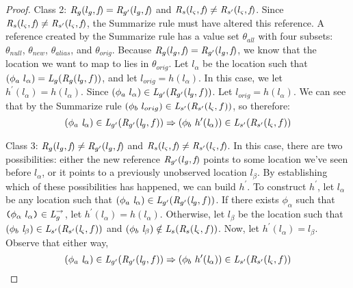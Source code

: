 \begin{proof}
Class 2: $\emph{R}_{g} ( l_{g},  \emph{f}) = \emph{R}_{g^\prime} ( l_{g},  \emph{f})$ and $\emph{R}_{s} ( l_{\varsigma},  \emph{f}) \neq \emph{R}_{s^\prime} ( l_{\varsigma},  \emph{f})$. Since $\emph{R}_{s} ( l_{\varsigma},  \emph{f}) \neq \emph{R}_{s^\prime} ( l_{\varsigma},  \emph{f})$, the Summarize rule must have altered this reference. A reference created by the Summarize rule has a value set $\theta_{all}$ with four subsets: $\theta_{null}$, $\theta_{new}$, $\theta_{alias}$, and $\theta_{orig}$. Because $\emph{R}_{g} ( l_{g},  \emph{f}) = \emph{R}_{g^\prime} ( l_{g},  \emph{f})$, we know that the location we want to map to lies in $\theta_{orig}$. Let $l_\alpha$ be the location such that ${(\phi_a\ l_\alpha)} = \cfgnt{L}_{\gse}(\cfgnt{R}_{\gse} (\cfgnt{l}_\gse,f )) $, and let $l_{orig} = h(l_\alpha)$. In this case, we let $h^\prime(l_\alpha) = h(l_\alpha)$. Since $(\phi_a\ l_\alpha) \in \emph{L}_{g^\prime}(\emph{R}_{g^\prime} (\emph{l}_{g},f ))$. Let $l_{orig} = h(l_\alpha)$. We can see that by the Summarize rule $ (\phi_b\ l_{orig})\in \emph{L}_{s^\prime}(\emph{R}_{s^\prime} (\emph{l}_{\varsigma},f ))$, so therefore:
$$(\phi_a\ \cfgnt{l}_\alpha) \in \cfgnt{L}_{\gse^\prime}(\cfgnt{R}_{\gse^\prime} (\cfgnt{l}_\gse,f )) \Rightarrow (\phi_b\ h^\prime (\cfgnt{l}_\alpha))\in \cfgnt{L}_{s^\prime}(\cfgnt{R}_{s^\prime} (\cfgnt{l}_\sym,f ))$$

Class 3: $\emph{R}_{g} ( l_{g},  \emph{f}) \neq \emph{R}_{g^\prime} ( l_{g},  \emph{f})$ and $\emph{R}_{s} ( l_{\varsigma},  \emph{f}) \neq \emph{R}_{s^\prime} ( l_{\varsigma},  \emph{f})$. In this case, there are two possibilities: either the new reference $\emph{R}_{g^\prime} ( l_{g},  \emph{f})$ points to some location we've seen before $l_\alpha$, or it points to a previously unobserved location $l_\beta$. By establishing which of these possibilities has happened, we can build $h^\prime$. To construct $h^\prime$, let $l_\alpha$ be any location such that $(\phi_a\ \cfgnt{l}_\alpha) \in \cfgnt{L}_{\gse^\prime}(\cfgnt{R}_{\gse^\prime} (\cfgnt{l}_\gse,f )) $. If there exists $\phi_\alpha$ such that $\texttt{(} \phi_\alpha\ l_\alpha \texttt{)} \in \emph{L}_{g}^\rightarrow $, let $h^\prime(l_\alpha) = h(l_\alpha)$. Otherwise, let $l_\beta$ be the location such that $(\phi_b\ \cfgnt{l}_\beta) \in \cfgnt{L}_{s^\prime}(\cfgnt{R}_{s^\prime} (\cfgnt{l}_\sym,f )) $ and $(\phi_b\ \cfgnt{l}_\beta) \notin \cfgnt{L}_{s}(\cfgnt{R}_{s} (\cfgnt{l}_\sym,f )) $. Now, let $h^\prime(l_\alpha) = l_\beta$. Observe that either way,
$$(\phi_a\ \cfgnt{l}_\alpha) \in \cfgnt{L}_{\gse^\prime}(\cfgnt{R}_{\gse^\prime} (\cfgnt{l}_\gse,f )) \Rightarrow (\phi_b\ h^\prime (\cfgnt{l}_\alpha))\in \cfgnt{L}_{s^\prime}(\cfgnt{R}_{s^\prime} (\cfgnt{l}_\sym,f ))$$


\end{proof}

